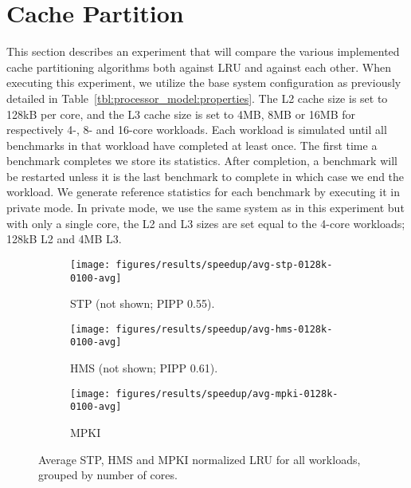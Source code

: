 
\section{Cache Partition}
\label{sec:results:cache_partition}

This section describes an experiment that will compare the various implemented cache partitioning algorithms both against LRU and against each other.
When executing this experiment, we utilize the base system configuration as previously detailed in Table~\ref{tbl:processor_model:properties}.
The L2 cache size is set to 128kB per core, and the L3 cache size is set to 4MB, 8MB or 16MB for respectively 4-, 8- and 16-core workloads.
Each workload is simulated until all benchmarks in that workload have completed at least once. 
The first time a benchmark completes we store its statistics.
After completion, a benchmark will be restarted unless it is the last benchmark to complete in which case we end the workload.
We generate reference statistics for each benchmark by executing it in private mode.
In private mode, we use the same system as in this experiment but with only a single core, the L2 and L3 sizes are set equal to the 4-core workloads; 128kB L2 and 4MB L3.

\begin{figure}[th]
    \centering
    \begin{subfigure}[b]{0.5\textwidth}
        \texttt{[image: figures/results/speedup/avg-stp-0128k-0100-avg]}
        \caption{STP (not shown; PIPP 0.55).}
        \label{fig:results:base:avg:stp}
    \end{subfigure}%
    \begin{subfigure}[b]{0.5\textwidth}
        \texttt{[image: figures/results/speedup/avg-hms-0128k-0100-avg]}
        \caption{HMS (not shown; PIPP 0.61).}
        \label{fig:results:base:avg:hms}
    \end{subfigure}
    \begin{subfigure}[b]{0.5\textwidth}
        \texttt{[image: figures/results/speedup/avg-mpki-0128k-0100-avg]}
        \caption{MPKI}
        \label{fig:results:base:avg:mpki}
    \end{subfigure}
    \caption{Average STP, HMS and MPKI normalized LRU for all workloads, grouped by number of cores.}
    \label{fig:results:base:avg}
\end{figure}



